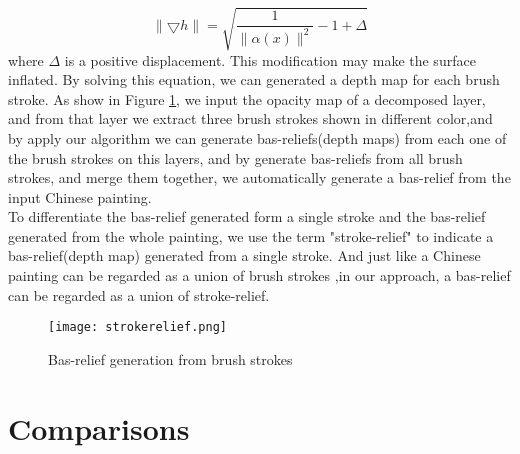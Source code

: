\begin{equation}
\lVert \bigtriangledown h \rVert = \sqrt{\frac{1}{\lVert \alpha(x) \rVert ^2}-1+ \Delta}
\end{equation}
where $\Delta$ is a positive displacement. This modification may make the surface inflated. By solving this equation, we can generated a depth map for each brush stroke. As show in Figure \ref{strokerelief}, we input the opacity map of a decomposed layer, and from that layer we extract three brush strokes shown in different color,and by apply our algorithm we can generate bas-reliefs(depth maps) from each one of the brush strokes on this layers, and by generate bas-reliefs from all brush strokes, and merge them together, we automatically generate a bas-relief from the input Chinese painting. \\
To differentiate the bas-relief generated form a single stroke and the bas-relief generated from the whole painting, we use the term "stroke-relief" to indicate a bas-relief(depth map) generated from a single stroke. And just like a Chinese painting can be regarded as a union of brush strokes \cite{xu2006animating} ,in our approach, a bas-relief can be regarded as a union of stroke-relief.
\begin{figure}[H]
	\centering
	\texttt{[image: strokerelief.png]}
	\caption{Bas-relief generation from brush strokes}
	\label{strokerelief}
\end{figure}


\section{Comparisons}\label{compare}

